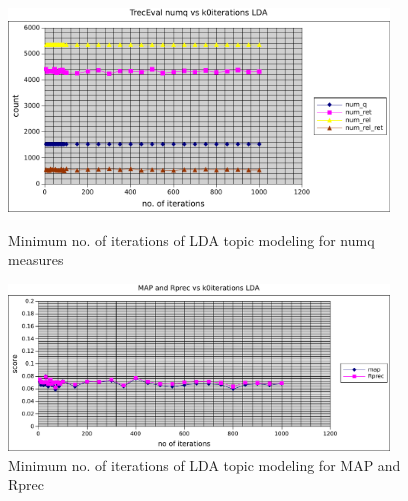 \begin{figure}
    \centering
    \begin{minipage}{0.45\textwidth}
        \centering
        \includegraphics[width=0.9\textwidth]{numq_k0iter_lda.pdf}
        \caption{Minimum no. of iterations of LDA topic modeling for numq measures}
    \end{minipage}\hfill
    \begin{minipage}{0.45\textwidth}
        \centering
        \includegraphics[width=0.9\textwidth]{map_rprec_k0iter_lda.pdf}
        \caption{Minimum no. of iterations of LDA topic modeling for MAP and Rprec}
    \end{minipage}
\end{figure}
